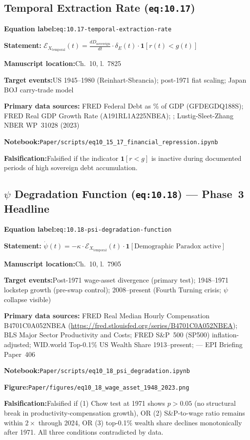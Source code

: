 \documentclass[12pt]{article}
\newcommand{\TierOne}{\textcolor{green!60!black}{\textbf{T1}}}
\newcommand{\caserow}[2]{%
  \noindent\textbf{#1:}\enspace #2\par\smallskip}
\begin{document}
\subsection{Temporal Extraction Rate (\texttt{eq:10.17})}

\begin{tcolorbox}[caseblock, title={%
  \TierOne\quad Temporal Extraction Rate}]

\caserow{Equation label}{\texttt{eq:10.17-temporal-extraction-rate}}
\caserow{Statement}{%
  $\mathcal{E}_{X_{\text{temporal}}}(t)
   = \tfrac{d D_{\text{sovereign}}}{dt}
     \cdot \delta_E(t)
     \cdot \mathbf{1}[r(t)<g(t)]$}
\caserow{Manuscript location}{Ch.~10, l.~7825}
\caserow{Target events}{US 1945--1980 (Reinhart-Sbrancia);
  post-1971 fiat scaling; Japan BOJ carry-trade model}
\caserow{Primary data sources}{%
  FRED Federal Debt as \% of GDP (GFDEGDQ188S);
  FRED Real GDP Growth Rate (A191RL1A225NBEA);
  \textcite{reinhart_sbrancia_2015};
  Lustig-Sleet-Zhang NBER WP~31028 (2023)}
\caserow{Notebook}{\texttt{Paper/scripts/eq10\_15\_17\_financial\_repression.ipynb}}
\caserow{Falsification}{Falsified if the indicator $\mathbf{1}[r<g]$
  is inactive during documented periods of high sovereign debt
  accumulation.}

\end{tcolorbox}

\subsection{$\psi$ Degradation Function (\texttt{eq:10.18})
  \texorpdfstring{---}{-} Phase~3 Headline}

\begin{tcolorbox}[caseblock, title={%
  \TierOne\quad $\psi$ Degradation Function --- Post-1971
  Wage-Asset Divergence}]

\caserow{Equation label}{\texttt{eq:10.18-psi-degradation-function}}
\caserow{Statement}{%
  $\dot{\psi}(t) = -\kappa \cdot
   \mathcal{E}_{X_{\text{temporal}}}(t) \cdot
   \mathbf{1}[\text{Demographic Paradox active}]$}
\caserow{Manuscript location}{Ch.~10, l.~7905}
\caserow{Target events}{Post-1971 wage-asset divergence (primary test);
  1948--1971 lockstep growth (pre-swap control);
  2008--present (Fourth Turning crisis; $\psi$ collapse visible)}
\caserow{Primary data sources}{%
  FRED Real Median Hourly Compensation B4701C0A052NBEA
  (\url{https://fred.stlouisfed.org/series/B4701C0A052NBEA});
  BLS Major Sector Productivity and Costs;
  FRED S\&P~500 (SP500) inflation-adjusted;
  WID.world Top-0.1\% US Wealth Share 1913--present;
  \textcite{bivens_mishel_2015} --- EPI Briefing Paper~406}
\caserow{Notebook}{\texttt{Paper/scripts/eq10\_18\_psi\_degradation.ipynb}}
\caserow{Figure}{\texttt{Paper/figures/eq10\_18\_wage\_asset\_1948\_2023.png}}
\caserow{Falsification}{Falsified if (1) Chow test at 1971 shows
  $p>0.05$ (no structural break in productivity-compensation growth),
  OR (2) S\&P-to-wage ratio remains within $2\times$ through 2024,
  OR (3) top-0.1\% wealth share declines monotonically after 1971.
  All three conditions contradicted by data.}

\end{tcolorbox}
\end{document}
